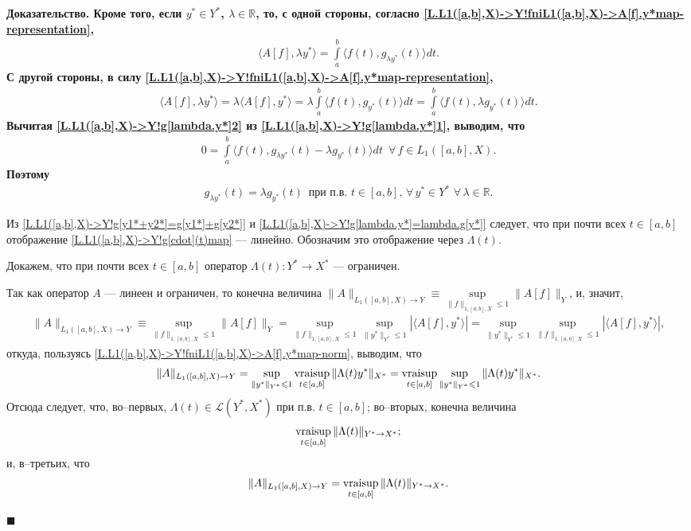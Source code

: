\documentclass{report}
\newenvironment{Proof}{\par\noindent\bf Доказательство.\rm}{ $\blacksquare$\par}
\newcommand{\vraisup}{\mathop{\rm vraisup}}
\begin{document}
\begin{Proof}
Кроме того, если $y^*\in Y^*$, $\lambda\in\mathbb{R}$, то, с одной стороны, согласно \eqref{L.L1([a,b],X)->Y!fniL1([a,b],X)->A[f].y*map-representation},
\begin{gather}\label{L.L1([a,b],X)->Y!g[lambda.y*]1}
\langle A[f],\lambda y^*\rangle=\int\limits_a^b\langle f(t),g_{\lambda y^*}(t)\rangle dt.
\end{gather}
С другой стороны, в силу \eqref{L.L1([a,b],X)->Y!fniL1([a,b],X)->A[f].y*map-representation},
\begin{gather}\label{L.L1([a,b],X)->Y!g[lambda.y*]2}
\langle A[f],\lambda y^*\rangle=\lambda\langle A[f],y^*\rangle=\lambda\int\limits_a^b\langle f(t),g_{y^*}(t)\rangle dt=\int\limits_a^b\langle f(t),\lambda g_{y^*}(t)\rangle dt.
\end{gather}
Вычитая \eqref{L.L1([a,b],X)->Y!g[lambda.y*]2} из \eqref{L.L1([a,b],X)->Y!g[lambda.y*]1}, выводим, что
\begin{gather*}
0=\int\limits_a^b\langle f(t),g_{\lambda y^*}(t)-\lambda g_{y^*}(t)\rangle dt\,\,\,\forall\,f\in L_1([a,b],X).
\end{gather*}
Поэтому
\begin{gather}\label{L.L1([a,b],X)->Y!g[lambda.y*]=lambda.g[y*]}
g_{\lambda y^*}(t)=\lambda g_{y^*}(t)\,\,\,\text{при п.в. $t\in[a,b]$, }\forall\,y^*\in Y^*\,\,\forall\,\lambda\in\mathbb{R}.
\end{gather}

Из \eqref{L.L1([a,b],X)->Y!g[y1*+y2*]=g[y1*]+g[y2*]} и \eqref{L.L1([a,b],X)->Y!g[lambda.y*]=lambda.g[y*]} следует, что при почти всех $t\in[a,b]$ отображение
\eqref{L.L1([a,b],X)->Y!g[cdot](t)map} --- линейно. Обозначим это отображение через $\Lambda(t)$.

Докажем, что при почти всех $t\in[a,b]$ оператор $\Lambda(t):Y^*\to X^*$ --- ограничен.

Так как оператор $A$ --- линеен и ограничен, то конечна величина $\|A\|_{L_1([a,b],X)\to Y}\equiv\sup\limits_{\|f\|_{1,[a,b],X}\leqslant1}\|A[f]\|_Y$, и, значит,
\begin{gather*}
\|A\|_{L_1([a,b],X)\to Y}\equiv\sup\limits_{\|f\|_{1,[a,b],X}\leqslant1}\|A[f]\|_Y=\sup\limits_{\|f\|_{1,[a,b],X}\leqslant1}\sup\limits_{\|y^*\|_{Y^*}\leqslant1}|\langle A[f],y^*\rangle|=
\sup\limits_{\|y^*\|_{Y^*}\leqslant1}\sup\limits_{\|f\|_{1,[a,b],X}\leqslant1}|\langle A[f],y^*\rangle|,
\end{gather*}
откуда, пользуясь \eqref{L.L1([a,b],X)->Y!fniL1([a,b],X)->A[f].y*map-norm}, выводим, что
\begin{gather*}
\|A\|_{L_1([a,b],X)\to Y}=\sup\limits_{\|y^*\|_{Y^*}\leqslant1}\vraisup\limits_{t\in[a,b]}\|\Lambda(t)y^*\|_{X^*}=
\vraisup\limits_{t\in[a,b]}\sup\limits_{\|y^*\|_{Y^*}\leqslant1}\|\Lambda(t)y^*\|_{X^*}.
\end{gather*}
Отсюда следует, что, во--первых, $\Lambda(t)\in\mathcal{L}(Y^*,X^*)$ при п.в. $t\in[a,b]$; во--вторых, конечна величина $$\vraisup\limits_{t\in[a,b]}\|\Lambda(t)\|_{Y^*\to X^*};$$ и,
в--третьих, что
\begin{gather}\label{L.L1([a,b],X)->Y!norm2}
\|A\|_{L_1([a,b],X)\to Y}=\vraisup\limits_{t\in[a,b]}\|\Lambda(t)\|_{Y^*\to X^*}.
\end{gather}


\end{Proof}
\end{document}
